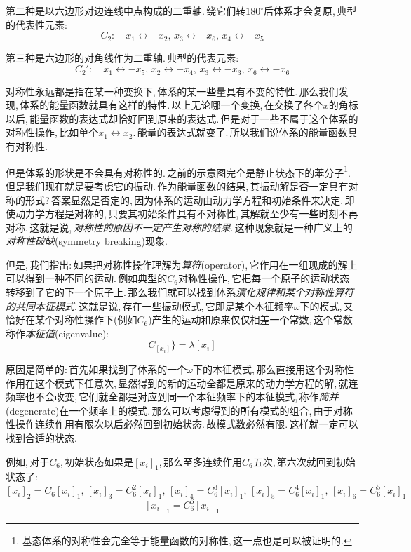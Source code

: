 第二种是以六边形对边连线中点构成的二重轴.\,绕它们转$180^\circ$后体系才会复原,\,典型的代表性元素:
\[C_2:\quad x_1\leftrightarrow -x_2,\,x_3\leftrightarrow -x_6,\,x_4\leftrightarrow -x_5\]

第三种是六边形的对角线作为二重轴.\,典型的代表元素:
\[C_2':\quad x_1\leftrightarrow -x_5,\,x_2\leftrightarrow -x_4,\,x_3\leftrightarrow -x_3,\,x_6\leftrightarrow -x_6\]

对称性永远都是指在某一种变换下,\,体系的某一些量具有不变的特性.\,那么我们发现,\,体系的能量函数就具有这样的特性.\,以上无论哪一个变换,\,在交换了各个$x$的角标以后,\,能量函数的表达式却恰好回到原来的表达式.\,但是对于一些不属于这个体系的对称性操作,\,比如单个$x_1\leftrightarrow x_2$.\,能量的表达式就变了.\,所以我们说体系的能量函数具有对称性.

但是体系的形状是不会具有对称性的.\,之前的示意图完全是静止状态下的苯分子\footnote{基态体系的对称性会完全等于能量函数的对称性,\,这一点也是可以被证明的.}.\,但是我们现在就是要考虑它的振动.\,作为能量函数的结果,\,其振动解是否一定具有对称的形式?\,答案显然是否定的,\,因为体系的运动由动力学方程和初始条件来决定.\,即使动力学方程是对称的,\,只要其初始条件具有不对称性,\,其解就至少有一些时刻不再对称.\,这就是说,\,\emph{对称性的原因不一定产生对称的结果}.\,这种现象就是一种广义上的\emph{对称性破缺}(symmetry breaking)现象.

但是,\,我们指出:\,如果把对称性操作理解为\emph{算符}(operator),\,它作用在一组现成的解上可以得到一种不同的运动.\,例如典型的$C_6$对称性操作,\,它把每一个原子的运动状态转移到了它的下一个原子上.\,那么我们就可以找到体系\emph{演化规律和某个对称性算符的共同本征模式}.\,这就是说,\,存在一些振动模式,\,它即是某个本征频率$\omega$下的模式,\,又恰好在某个对称性操作下(例如$C_6$)产生的运动和原来仅仅相差一个常数,\,这个常数称作\emph{本征值}(eigenvalue):
\[C_[x_i]\}=\lambda[x_i]\]

原因是简单的:\,首先如果找到了体系的一个$\omega$下的本征模式,\,那么直接用这个对称性作用在这个模式下任意次,\,显然得到的新的运动全都是原来的动力学方程的解,\,就连频率也不会改变,\,它们就全都是对应到同一个本征频率下的本征模式,\,称作\emph{简并}(degenerate)在一个频率上的模式.\,那么可以考虑得到的所有模式的组合,\,由于对称性操作连续作用有限次以后必然回到初始状态.\,故模式数必然有限.\,这样就一定可以找到合适的状态.

\newpage
例如,\,对于$C_6$,\,初始状态如果是$[x_i]_1$,\,那么至多连续作用$C_6$五次,\,第六次就回到初始状态了:
\[[x_i]_2=C_6[x_i]_1,\,[x_i]_3=C_6^2[x_i]_1,\,[x_i]_4=C_6^3[x_i]_1,\,[x_i]_5=C_6^4[x_i]_1,\,[x_i]_6=C_6^5[x_i]_1\]
\[[x_i]_1=C_6^6[x_i]_1\]

